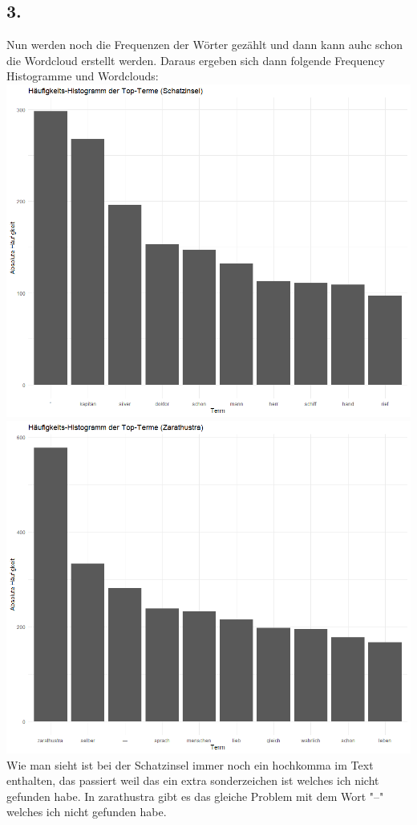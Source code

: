 \documentclass{scrartcl}
\begin{document}
\subsection*{3. }
Nun werden noch die Frequenzen der Wörter gezählt und dann kann auhc schon die Wordcloud erstellt werden. Daraus ergeben sich dann folgende Frequency Histogramme und Wordclouds:\\
\includegraphics*[scale=0.3]{freqHistSchatzinsel.png}
\includegraphics*[scale=0.3]{freqHistZarathustra.png}\\
Wie man sieht ist bei der Schatzinsel immer noch ein hochkomma im Text enthalten, das passiert weil das ein extra sonderzeichen ist welches ich nicht gefunden habe. In zarathustra gibt es das gleiche Problem mit dem Wort "--" welches ich nicht gefunden habe.\\
\end{document}
